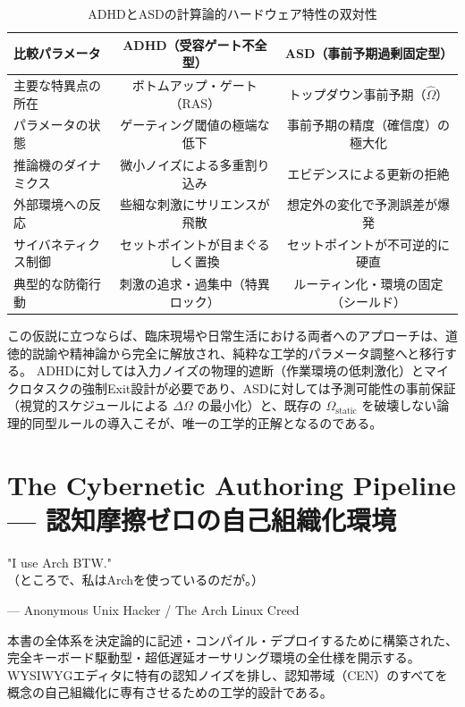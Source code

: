 \begin{table}[htbp]
\centering
\caption{ADHDとASDの計算論的ハードウェア特性の双対性}
\label{tab:adhd_asd_duality}
\begin{tabular}{lcc}
\toprule
\textbf{比較パラメータ} & \textbf{ADHD（受容ゲート不全型）} & \textbf{ASD（事前予期過剰固定型）} \\
\midrule
主要な特異点の所在 & ボトムアップ・ゲート（RAS） & トップダウン事前予期（$\hat{\Omega}$） \\
パラメータの状態 & ゲーティング閾値の極端な低下 & 事前予期の精度（確信度）の極大化 \\
推論機のダイナミクス & 微小ノイズによる多重割り込み & エビデンスによる更新の拒絶 \\
外部環境への反応 & 些細な刺激にサリエンスが飛散 & 想定外の変化で予測誤差が爆発 \\
サイバネティクス制御 & セットポイントが目まぐるしく置換 & セットポイントが不可逆的に硬直 \\
典型的な防衛行動 & 刺激の追求・過集中（特異ロック） & ルーティン化・環境の固定（シールド） \\
\bottomrule
\end{tabular}
\end{table}

この仮説に立つならば、臨床現場や日常生活における両者へのアプローチは、道徳的説諭や精神論から完全に解放され、純粋な工学的パラメータ調整へと移行する。
ADHDに対しては入力ノイズの物理的遮断（作業環境の低刺激化）とマイクロタスクの強制Exit設計が必要であり、ASDに対しては予測可能性の事前保証（視覚的スケジュールによる $\Delta \Omega$ の最小化）と、既存の $\Omega_{\mathrm{static}}$ を破壊しない論理的同型ルールの導入こそが、唯一の工学的正解となるのである。

\chapter{The Cybernetic Authoring Pipeline --- 認知摩擦ゼロの自己組織化環境}
\label{cha:authoring_pipeline}
\epigraph{"I use Arch BTW."\\
\small（ところで、私はArchを使っているのだが。）}{--- Anonymous Unix Hacker / The Arch Linux Creed}

本書の全体系を決定論的に記述・コンパイル・デプロイするために構築された、完全キーボード駆動型・超低遅延オーサリング環境の全仕様を開示する。
WYSIWYGエディタに特有の認知ノイズを排し、認知帯域（CEN）のすべてを概念の自己組織化に専有させるための工学的設計である。

